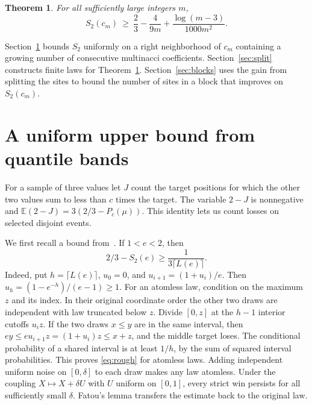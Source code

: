 \documentclass[11pt,reqno]{amsart}
\newtheorem{theorem}{Theorem}[section]
\newcommand{\EE}{\mathbb E}
\begin{document}
\begin{theorem}\label{th:corr}
For all sufficiently large integers $m$,
\[
 S_2(c_m)\ \ge\ \frac23-\frac{4}{9m}
            +\frac{\log(m-3)}{1000m^2}.
\]
\end{theorem}

Section~\ref{sec:band} bounds $S_2$ uniformly on a right neighborhood
of $c_m$ containing a growing number of consecutive multinacci
coefficients. Section~\ref{sec:split}
constructs finite laws for Theorem~\ref{th:corr}.
Section~\ref{sec:blocks} uses the gain from splitting the sites to
bound the number of sites in a block that improves on $S_2(c_m)$.

\section{A uniform upper bound from quantile bands}\label{sec:band}
For a sample of three values let $J$ count the target
positions for which the other two values sum to less than $c$ times
the target. The variable $2-J$ is nonnegative and
$\EE(2-J)=3(2/3-P_c(\mu))$. This identity lets us count losses on
selected disjoint events.

We first recall a bound from~\cite{wp}. If $1<e<2$, then
\begin{equation}\label{eq:rough}
 2/3-S_2(e)\ge\frac1{3\lceil L(e)\rceil}.
\end{equation}
Indeed, put $h=\lceil L(e)\rceil$, $u_0=0$, and
$u_{i+1}=(1+u_i)/e$. Then $u_h=(1-e^{-h})/(e-1)\ge1$.
For an atomless law, condition on the maximum $z$ and its index.
In their original coordinate order the other two draws are independent
with law truncated below $z$. Divide $[0,z]$ at the $h-1$ interior
cutoffs $u_i z$. If the two draws $x\le y$ are in the same interval,
then $ey\le e u_{i+1}z=(1+u_i)z\le x+z$, and the middle target loses.
The conditional probability of a shared interval is at least $1/h$,
by the sum of squared interval probabilities. This proves
\eqref{eq:rough} for atomless laws. Adding independent uniform noise on
$[0,\delta]$ to each draw makes any law atomless. Under the coupling
$X\mapsto X+\delta U$ with $U$ uniform on $[0,1]$, every strict win
persists for all sufficiently small $\delta$. Fatou's lemma transfers
the estimate back to the original law.
\end{document}
